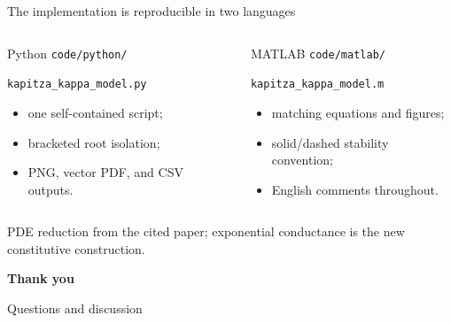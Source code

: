 \documentclass[aspectratio=169,11pt]{beamer}
\begin{document}
\begin{frame}{The implementation is reproducible in two languages}
  \begin{columns}[T,onlytextwidth]
      \begin{block}{Python}
        \texttt{code/python/}\par
        \texttt{kapitza\_kappa\_model.py}
        \begin{itemize}
          \item one self-contained script;
          \item bracketed root isolation;
          \item PNG, vector PDF, and CSV outputs.
        \end{itemize}
      \end{block}
      \begin{block}{MATLAB}
        \texttt{code/matlab/}\par
        \texttt{kapitza\_kappa\_model.m}
        \begin{itemize}
          \item matching equations and figures;
          \item solid/dashed stability convention;
          \item English comments throughout.
        \end{itemize}
      \end{block}
  \end{columns}
  \vspace{0.5em}
  \begin{center}
    \small PDE reduction from the cited paper; exponential conductance is the new constitutive construction.
  \end{center}
\end{frame}

\begin{frame}[plain]
  \vfill
  \begin{center}
    {\Huge\bfseries\color{navy}Thank you}\par
    \vspace{1em}
    {\large\color{graytext}Questions and discussion}
  \end{center}
  \vfill
\end{frame}
\end{document}
